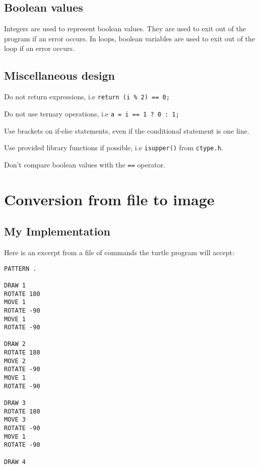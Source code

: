 \documentclass[a4paper, 12pt, titlepage]{article}
\newcommand{\code}[1]{\small\texttt{#1}\normalsize}
\begin{document}
\subsection{Boolean values}

Integers are used to represent boolean values. They are used to exit 
out of the program if an error occurs. In loops, boolean variables are 
used to exit out of the loop if an error occurs.

\subsection{Miscellaneous design}

\begin{itemize}[label={--}]
\begin{samepage}
    \item Do not return expressions, i.e \code{return (i \% 2) == 0;}
    \item Do not use ternary operations, i.e \code{a = i == 1 ? 0 : 1;}
    \item Use brackets on if-else statements, even if the conditional 
          statement is one line.
    \item Use provided library functions if possible, i.e \code{isupper()} 
          from \code{ctype.h}.
    \item Don't compare boolean values with the \code{==} operator.
\end{samepage}
\end{itemize}

\newpage


\section{Conversion from file to image}

\subsection{My Implementation}

Here is an excerpt from a file of commands the turtle program will accept:

\begin{lstlisting}
PATTERN .

DRAW 1
ROTATE 180
MOVE 1
ROTATE -90
MOVE 1
ROTATE -90

DRAW 2
ROTATE 180
MOVE 2
ROTATE -90
MOVE 1
ROTATE -90

DRAW 3
ROTATE 180
MOVE 3
ROTATE -90
MOVE 1
ROTATE -90

DRAW 4
\end{lstlisting}
\end{document}
